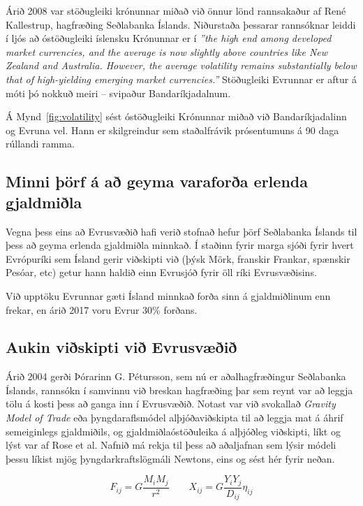 \documentclass[a4paper]{article}
\begin{document}
Árið 2008 var stöðugleiki krónunnar miðað við önnur lönd rannsakaður af René Kallestrup, hagfræðing Seðlabanka Íslands. Niðurstaða þessarar rannsóknar leiddi í ljós að óstöðugleiki íslensku Krónunnar er í \textit{''the high end among developed market currencies, and the average is now slightly above countries like New Zealand and Australia. However, the average volatility remains substantially below that of high-yielding emerging market currencies.''} Stöðugleiki Evrunnar er aftur á móti þó nokkuð meiri – svipaður Bandaríkjadalnum.\cite{icb_volatility_2008}

Á Mynd~\ref{fig:volatility} sést óstöðugleiki Krónunnar miðað við Bandaríkjadalinn og Evruna vel. Hann er skilgreindur sem staðalfrávik prósentumuns á 90 daga rúllandi ramma.


\subsection{Minni þörf á að geyma varaforða erlenda gjaldmiðla}

Vegna þess eins að Evrusvæðið hafi verið stofnað hefur þörf Seðlabanka Íslands til þess að geyma erlenda gjaldmiðla minnkað. Í staðinn fyrir marga sjóði fyrir hvert Evrópuríki sem Ísland gerir viðskipti við (þýsk Mörk, franskir Frankar, spænskir Pesóar, etc) getur hann haldið einn Evrusjóð fyrir öll ríki Evrusvæðisins.

Við upptöku Evrunnar gæti Ísland minnkað forða sinn á gjaldmiðlinum enn frekar\cite{saga_evropusamrunans}, en árið 2017 voru Evrur 30\% forðans.\cite{icb_annual_2017}

\subsection{Aukin viðskipti við Evrusvæðið}

Árið 2004 gerði Þórarinn G. Pétursson, sem nú er aðalhagfræðingur Seðlabanka Íslands, rannsókn í samvinnu við breskan hagfræðing þar sem reynt var að leggja tölu á kosti þess að ganga inn í Evrusvæðið. Notast var við svokallað \textit{Gravity Model of Trade} eða þyngdaraflsmódel alþjóðaviðskipta til að leggja mat á áhrif semeiginlegs gjaldmiðils, og gjaldmiðlaóstöðuleika á alþjóðleg viðskipti, líkt og lýst var af Rose et al.\cite{rose2000} Nafnið má rekja til þess að aðaljafnan sem lýsir módeli þessu líkist mjög þyngdarkraftslögmáli Newtons, eins og sést hér fyrir neðan.

\[F_{ij} = G\frac{M_{i}M_{j}}{r^{2}} \qquad X_{ij} = G\frac{Y_{i}Y_{j}}{D_{ij}}\eta_{ij}\]
\end{document}
